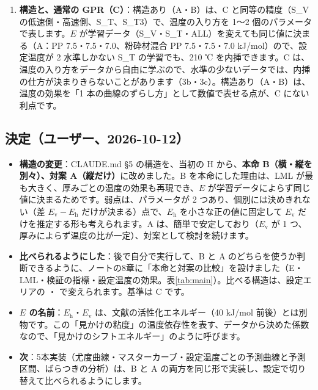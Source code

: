 \documentclass[paper=a4paper,fontsize=10.5pt,line_length=44zw,number_of_lines=38]{jlreq}
\newcommand{\file}[1]{\texttt{\detokenize{#1}}}
\newcommand{\Eh}{E_{\mathrm{h}}}
\newcommand{\Ev}{E_{\mathrm{v}}}
\newenvironment{points}{\begin{itemize}[label=$\triangleright$,leftmargin=1.5\zw,itemsep=0.3ex,topsep=0.5ex,parsep=0pt]}{\end{itemize}}
\newcommand{\pt}[1]{\item \textbf{#1}：}
\begin{document}
\begin{enumerate}[itemsep=0.6ex,topsep=0.6ex]
\item \textbf{構造と、通常の GPR（C）}：構造あり（A・B）は、C と同等の精度（S\_V の低速側・高速側、S\_T、S\_T3）で、温度の入り方を 1〜2 個のパラメータで表します。$E$ が学習データ（S\_V・S\_T・ALL）を変えても同じ値に決まる（A：PP 7.5・7.5・7.0、粉砕材混合 PP 7.5・7.5・7.0 kJ/mol）ので、設定温度が 2 水準しかない S\_T の学習でも、210 ℃ を内挿できます。C は、温度の入り方をデータから自由に学ぶので、水準の少ないデータでは、内挿の仕方が決まりきらないことがあります（3b・3c）。構造あり（A・B）は、温度の効果を「1 本の曲線のずらし方」として数値で表せる点が、C にない利点です。
\end{enumerate}

\subsection{決定（ユーザー、2026-10-12）}
\begin{points}
\pt{構造の変更}CLAUDE.md §5 の構造を、当初の H から、\textbf{本命 B（横・縦を別々）、対案 A（縦だけ）}に改めました。B を本命にした理由は、LML が最も大きく、厚みごとの温度の効果も再現でき、$E$ が学習データによらず同じ値に決まるためです。弱点は、パラメータが 2 つあり、個別には決めきれない（差 $\Ev-\Eh$ だけが決まる）点で、$\Eh$ を小さな正の値に固定して $\Ev$ だけを推定する形も考えられます。A は、簡単で安定しており（$\Ev$ が 1 つ、厚みによらず温度の比が一定）、対案として検討を続けます。
\pt{比べられるようにした}後で自分で実行して、B と A のどちらを使うか判断できるように、ノートの8章に「本命と対案の比較」を設けました（E・LML・検証の指標・設定温度の効果。表\ref{tab:main}）。比べる構造は、設定エリアの \file{MAIN_STRUCT}・\file{ALT_STRUCT} で変えられます。基準は C です。
\pt{$E$ の名前}$\Eh$・$\Ev$ は、文献の活性化エネルギー（40 kJ/mol 前後）とは別物です。この「見かけの粘度」の温度依存性を表す、データから決めた係数なので、「見かけのシフトエネルギー」のように呼びます。
\pt{次}5本実装（尤度曲線・マスターカーブ・設定温度ごとの予測曲線と予測区間、ばらつきの分析）は、B と A の両方を同じ形で実装し、設定で切り替えて比べられるようにします。
\end{points}
\end{document}
